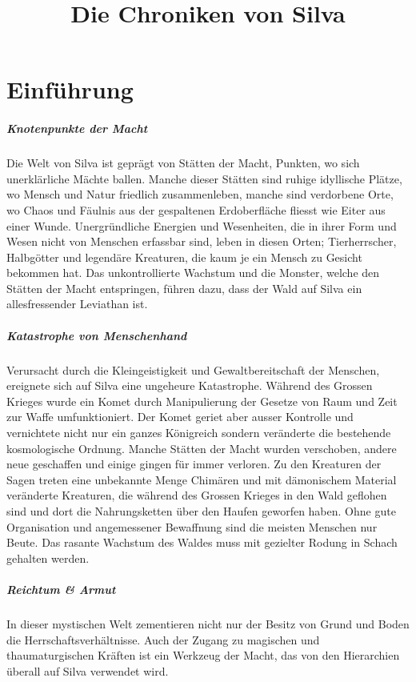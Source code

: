 \documentclass[10pt,twoside,twocolumn,openany]{book}
\title{Die Chroniken von Silva}
\begin{document}
\tableofcontents



\chapter{Einführung}
\begin{multicols}{2}
\paragraph{Knotenpunkte der Macht} Die Welt von Silva ist geprägt von Stätten der Macht, Punkten, wo sich unerklärliche Mächte ballen. Manche dieser Stätten sind ruhige idyllische Plätze, wo Mensch und Natur friedlich zusammenleben, manche sind verdorbene Orte, wo Chaos und Fäulnis aus der gespaltenen Erdoberfläche fliesst wie Eiter aus einer Wunde. Unergründliche Energien und Wesenheiten, die in ihrer Form und Wesen nicht von Menschen erfassbar sind, leben in diesen Orten; Tierherrscher, Halbgötter und legendäre Kreaturen, die kaum je ein Mensch zu Gesicht bekommen hat. Das unkontrollierte Wachstum und die Monster, welche den Stätten der Macht entspringen, führen dazu, dass der Wald auf Silva ein allesfressender Leviathan ist.
	
	\paragraph{Katastrophe von Menschenhand} Verursacht durch die Kleingeistigkeit und Gewaltbereitschaft der Menschen, ereignete sich auf Silva eine ungeheure Katastrophe. Während des Grossen Krieges wurde ein Komet durch Manipulierung der Gesetze von Raum und Zeit zur Waffe umfunktioniert. Der Komet geriet aber ausser Kontrolle und vernichtete nicht nur ein ganzes Königreich sondern veränderte die bestehende kosmologische Ordnung. Manche Stätten der Macht wurden verschoben, andere neue geschaffen und einige gingen für immer verloren. Zu den Kreaturen der Sagen treten eine unbekannte Menge Chimären und mit dämonischem Material veränderte Kreaturen, die während des Grossen Krieges in den Wald geflohen sind und dort die Nahrungsketten über den Haufen geworfen haben. Ohne gute Organisation und angemessener Bewaffnung sind die meisten Menschen nur Beute. Das rasante Wachstum des Waldes muss mit gezielter Rodung in Schach gehalten werden.
	
	\paragraph{Reichtum \& Armut}
	In dieser mystischen Welt zementieren nicht nur der Besitz von Grund und Boden die Herrschaftsverhältnisse. Auch der Zugang zu magischen und thaumaturgischen Kräften ist ein Werkzeug der Macht, das von den Hierarchien überall auf Silva verwendet wird.
	

\end{multicols}
\end{document}
